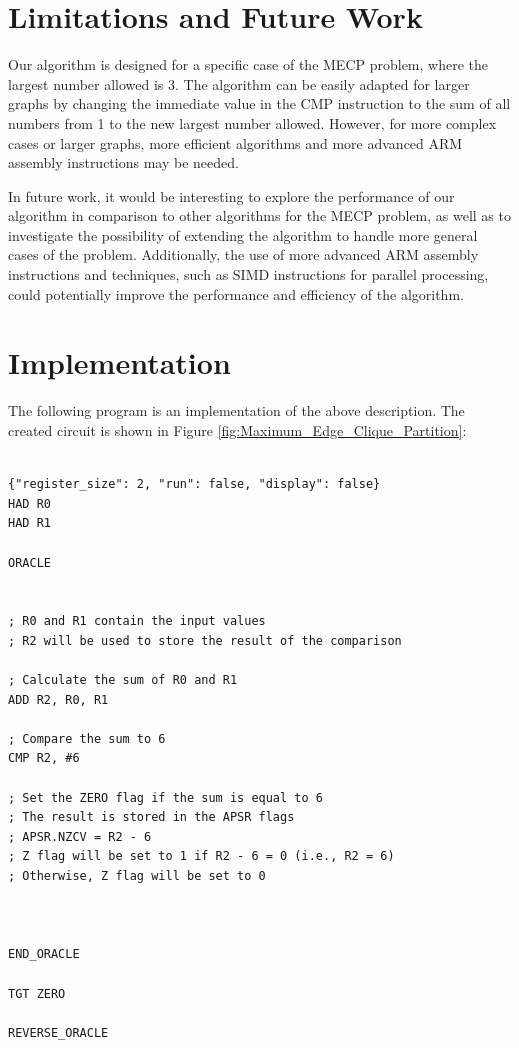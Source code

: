 \begin{enumerate}
\section{Limitations and Future Work}

Our algorithm is designed for a specific case of the MECP problem, where the largest number allowed is 3. The algorithm can be easily adapted for larger graphs by changing the immediate value in the CMP instruction to the sum of all numbers from 1 to the new largest number allowed. However, for more complex cases or larger graphs, more efficient algorithms and more advanced ARM assembly instructions may be needed.

In future work, it would be interesting to explore the performance of our algorithm in comparison to other algorithms for the MECP problem, as well as to investigate the possibility of extending the algorithm to handle more general cases of the problem. Additionally, the use of more advanced ARM assembly instructions and techniques, such as SIMD instructions for parallel processing, could potentially improve the performance and efficiency of the algorithm.



\section{Implementation}

The following program is an implementation of the above description. The created circuit is shown in Figure \ref{fig:Maximum_Edge_Clique_Partition}:

\begin{lstlisting}

{"register_size": 2, "run": false, "display": false}
HAD R0
HAD R1

ORACLE


; R0 and R1 contain the input values
; R2 will be used to store the result of the comparison

; Calculate the sum of R0 and R1
ADD R2, R0, R1

; Compare the sum to 6
CMP R2, #6

; Set the ZERO flag if the sum is equal to 6
; The result is stored in the APSR flags
; APSR.NZCV = R2 - 6
; Z flag will be set to 1 if R2 - 6 = 0 (i.e., R2 = 6)
; Otherwise, Z flag will be set to 0



END_ORACLE

TGT ZERO

REVERSE_ORACLE


\end{lstlisting}
\end{enumerate}

